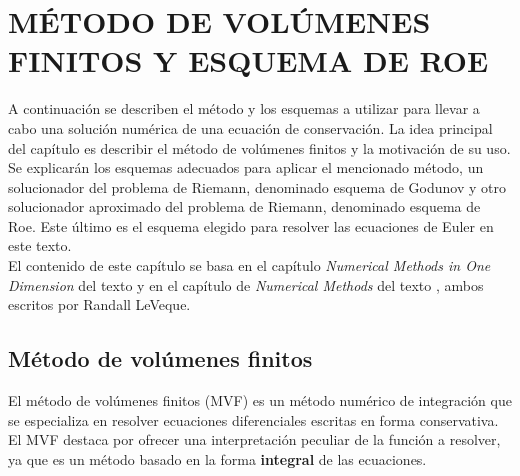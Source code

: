 \chapter{MÉTODO DE VOLÚMENES FINITOS Y ESQUEMA DE ROE}
A continuación se describen el método y los esquemas a utilizar para llevar a cabo una solución numérica de una ecuación de conservación. La idea principal del capítulo es describir el método de volúmenes finitos y la motivación de su uso. Se explicarán los esquemas adecuados para aplicar el mencionado método, un solucionador del problema de Riemann, denominado esquema de Godunov y otro solucionador aproximado del problema de Riemann, denominado esquema de Roe. Este último es el esquema elegido para resolver las ecuaciones de Euler en este texto.\\
El contenido de este capítulo se basa en el capítulo \textit{Numerical Methods in One Dimension} del texto \cite{LeVequeAstro} y en el capítulo de \textit{Numerical Methods} del texto \cite{LeVeque}, ambos escritos por Randall LeVeque.

\section{Método de volúmenes finitos}
El método de volúmenes finitos (MVF) es un método numérico de integración que se especializa en resolver ecuaciones diferenciales escritas en forma conservativa. El MVF destaca por ofrecer una interpretación peculiar de la función a resolver, ya que es un método basado en la forma \textbf{integral} de las ecuaciones.
